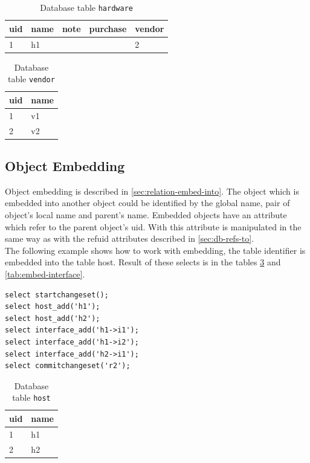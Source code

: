 \documentclass[deska]{subfiles}
\begin{document}
\begin{longtable}{ l | l | l | l | l }
    \caption{Database table {\tt hardware}}
    \label{tab:refs-hardware} \\
    uid & name & note & purchase & vendor\\
    \hline
    \endhead
    1 & h1 &  &  & 2\\
    \hline
\end{longtable}

\begin{longtable}{ l | l }
    \caption{Database table {\tt vendor}}
    \label{tab:refs-vendor} \\
    uid & name \\
    \hline
    \endhead
    1 & v1\\
    2 & v2\\
    \hline
\end{longtable}


\subsection{Object Embedding}
Object embedding is described in \ref{sec:relation-embed-into}. The object which is embedded into another object could be identified by the global name, pair of object's local name and parent's name. Embedded objects have an attribute which refer to the parent object's uid. With this attribute is manipulated in the same way as with the refuid attributes described in \ref{sec:db-refs-to}.\\
The following example shows how to work with embedding, the table identifier is embedded into the table host. Result of these selects is in the tables \ref{tab:embed-host} and \ref{tab:embed-interface}.

\begin{verbatim}
select startchangeset();
select host_add('h1');
select host_add('h2');
select interface_add('h1->i1');
select interface_add('h1->i2');
select interface_add('h2->i1');
select commitchangeset('r2');
\end{verbatim}


\begin{longtable}{ l | l }
    \caption{Database table {\tt host}}
    \label{tab:embed-host} \\
    uid & name \\
    \hline
    \endhead
    1 & h1\\
    2 & h2\\
    \hline
\end{longtable}
\end{document}
